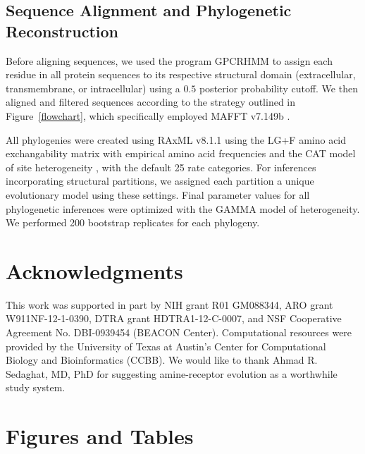 \documentclass[fleqn,10pt]{wlpeerj}
\begin{document}
\subsection*{Sequence Alignment and Phylogenetic Reconstruction}
Before aligning sequences, we used the program GPCRHMM \citep{Wistrand2006} to assign each residue in all protein sequences to its respective structural domain (extracellular, transmembrane, or intracellular) using a $0.5$ posterior probability cutoff. We then aligned and filtered sequences according to the strategy outlined in Figure~\ref{flowchart}, which specifically employed MAFFT v7.149b \citep{mafftv7}. 

All phylogenies were created using RAxML v8.1.1 \citep{raxml} using the LG+F \citep{LG} amino acid exchangability matrix with empirical amino acid frequencies and the CAT model of site heterogeneity \citep{Stamatakis2006}, with the default 25 rate categories. For inferences incorporating structural partitions, we assigned each partition a unique evolutionary model using these settings. Final parameter values for all phylogenetic inferences were optimized with the GAMMA model of heterogeneity. We performed 200 bootstrap replicates for each phylogeny.



\section*{Acknowledgments}
This work was supported in part by NIH grant R01 GM088344, ARO grant W911NF-12-1-0390, DTRA grant HDTRA1-12-C-0007, and NSF Cooperative Agreement No. DBI-0939454 (BEACON Center).  Computational resources were provided by the University of Texas at Austin's Center for Computational Biology and Bioinformatics (CCBB). We would like to thank Ahmad R. Sedaghat, MD, PhD for suggesting amine-receptor evolution as a worthwhile study system.





\newpage


\section*{Figures and Tables}

\vspace{2cm}
\end{document}
